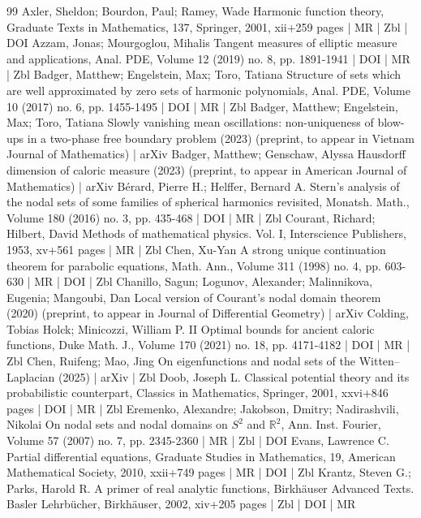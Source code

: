 \begin{thebibliography}{99}
Axler, Sheldon; Bourdon, Paul; Ramey, Wade Harmonic function theory, Graduate Texts in Mathematics, 137, Springer, 2001, xii+259 pages | MR | Zbl | DOI
Azzam, Jonas; Mourgoglou, Mihalis Tangent measures of elliptic measure and applications, Anal. PDE, Volume 12 (2019) no. 8, pp. 1891-1941 | DOI | MR | Zbl
Badger, Matthew; Engelstein, Max; Toro, Tatiana Structure of sets which are well approximated by zero sets of harmonic polynomials, Anal. PDE, Volume 10 (2017) no. 6, pp. 1455-1495 | DOI | MR | Zbl
Badger, Matthew; Engelstein, Max; Toro, Tatiana Slowly vanishing mean oscillations: non-uniqueness of blow-ups in a two-phase free boundary problem (2023) (preprint, to appear in Vietnam Journal of Mathematics) | arXiv
Badger, Matthew; Genschaw, Alyssa Hausdorff dimension of caloric measure (2023) (preprint, to appear in American Journal of Mathematics) | arXiv
Bérard, Pierre H.; Helffer, Bernard A. Stern’s analysis of the nodal sets of some families of spherical harmonics revisited, Monatsh. Math., Volume 180 (2016) no. 3, pp. 435-468 | DOI | MR | Zbl
Courant, Richard; Hilbert, David Methods of mathematical physics. Vol. I, Interscience Publishers, 1953, xv+561 pages | MR | Zbl
Chen, Xu-Yan A strong unique continuation theorem for parabolic equations, Math. Ann., Volume 311 (1998) no. 4, pp. 603-630 | MR | DOI | Zbl
Chanillo, Sagun; Logunov, Alexander; Malinnikova, Eugenia; Mangoubi, Dan Local version of Courant’s nodal domain theorem (2020) (preprint, to appear in Journal of Differential Geometry) | arXiv
Colding, Tobias Holck; Minicozzi, William P. II Optimal bounds for ancient caloric functions, Duke Math. J., Volume 170 (2021) no. 18, pp. 4171-4182 | DOI | MR | Zbl
Chen, Ruifeng; Mao, Jing On eigenfunctions and nodal sets of the Witten–Laplacian (2025) | arXiv | Zbl
Doob, Joseph L. Classical potential theory and its probabilistic counterpart, Classics in Mathematics, Springer, 2001, xxvi+846 pages | DOI | MR | Zbl
Eremenko, Alexandre; Jakobson, Dmitry; Nadirashvili, Nikolai On nodal sets and nodal domains on ${S}^2$ and $\mathbb{R}^2$, Ann. Inst. Fourier, Volume 57 (2007) no. 7, pp. 2345-2360 | MR | Zbl | DOI
Evans, Lawrence C. Partial differential equations, Graduate Studies in Mathematics, 19, American Mathematical Society, 2010, xxii+749 pages | MR | DOI | Zbl
Krantz, Steven G.; Parks, Harold R. A primer of real analytic functions, Birkhäuser Advanced Texts. Basler Lehrbücher, Birkhäuser, 2002, xiv+205 pages | Zbl | DOI | MR

\end{thebibliography}

